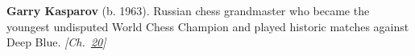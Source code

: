 \textbf{Garry Kasparov} (b. 1963). Russian chess grandmaster who became the youngest undisputed World Chess Champion and played historic matches against Deep Blue. \emph{[Ch.~\hyperref[ch:chineseroomargument]{20}]}

